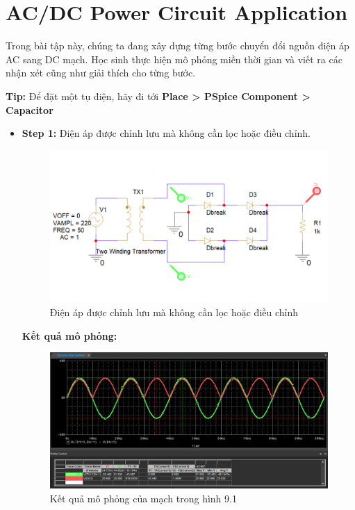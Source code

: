 \section{AC/DC Power Circuit Application}
Trong bài tập này, chúng ta đang xây dựng từng bước chuyển đổi nguồn điện áp AC sang DC
mạch. Học sinh thực hiện mô phỏng miền thời gian và viết ra các nhận xét cũng như giải thích cho từng bước.

\textbf{Tip:} Để đặt một tụ điện, hãy đi tới  \textbf{Place > PSpice Component > Capacitor}
\begin{itemize}
    \item \textbf{Step 1:} Điện áp được chỉnh lưu mà không cần lọc hoặc điều chỉnh.
    \begin{figure}[ht]
        \centering
        \includegraphics[scale= 0.26]{graphics/ex9/f1.png}
        \caption{Điện áp được chỉnh lưu mà không cần lọc hoặc điều chỉnh}
    \end{figure}
\pagebreak

    \textbf{Kết quả mô phỏng: }

    \begin{figure}[ht]
        \centering
        \includegraphics[scale= 0.2]{graphics/ex9/f2.png}
        \caption{Kết quả mô phỏng của mạch trong hình 9.1}
    \end{figure}


\end{itemize}
